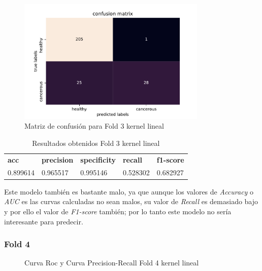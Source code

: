 \begin{figure}[H]
	\centering
	\includegraphics[width=90mm]{imagenes/confusion_mat3_gpflow_linear}
	\caption{Matriz de confusión para Fold 3 kernel lineal}
	\label{fig:conf3_lin}
\end{figure}

\begin{table}[H]
	\centering
	\begin{tabular}{lllll}
		\textbf{acc} & \textbf{precision} & \textbf{specificity} & \textbf{recall} & \textbf{f1-score} \\
		0.899614     & 0.965517           & 0.995146             & 0.528302        & 0.682927         \\      
	\end{tabular}
	\caption{Resultados obtenidos Fold 3 kernel lineal}
	\label{table:8}
\end{table}

Este modelo también es bastante malo, ya que aunque los valores de \textit{Accuracy} o \textit{AUC} es las curvas calculadas no sean malos, su valor de \textit{Recall} es demasiado bajo y por ello el valor de \textit{F1-score} también; por lo tanto este modelo no sería interesante para predecir.

\subsubsection{Fold 4}

\begin{figure}[H]
	\centering
	\caption{Curva Roc y Curva Precision-Recall Fold 4 kernel lineal}
	\label{fig:resultados4_linear}
\end{figure}

